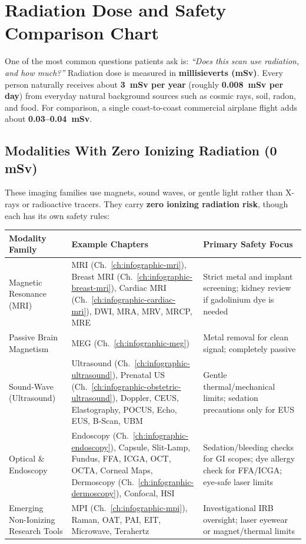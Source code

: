 \chapter{Radiation Dose and Safety Comparison Chart}
\label{app:radiation-chart}

\noindent
One of the most common questions patients ask is: \emph{``Does this scan use radiation, and how much?''} Radiation dose is measured in \textbf{millisieverts (mSv)}. Every person naturally receives about \textbf{3~mSv per year} (roughly \textbf{0.008~mSv per day}) from everyday natural background sources such as cosmic rays, soil, radon, and food. For comparison, a single coast-to-coast commercial airplane flight adds about \textbf{0.03--0.04~mSv}.

\section{Modalities With Zero Ionizing Radiation (0 mSv)}
These imaging families use magnets, sound waves, or gentle light rather than X-rays or radioactive tracers. They carry \textbf{zero ionizing radiation risk}, though each has its own safety rules:

{\renewcommand{\arraystretch}{1.25}\noindent
\begin{tabularx}{\textwidth}{@{}p{} p{} X@{}}
\toprule
\textbf{Modality Family} & \textbf{Example Chapters} & \textbf{Primary Safety Focus} \\
\midrule
Magnetic Resonance (MRI) & MRI (Ch.~\ref{ch:infographic-mri}), Breast MRI (Ch.~\ref{ch:infographic-breast-mri}), Cardiac MRI (Ch.~\ref{ch:infographic-cardiac-mri}), DWI, MRA, MRV, MRCP, MRE & Strict metal and implant screening; kidney review if gadolinium dye is needed \\
Passive Brain Magnetism & MEG (Ch.~\ref{ch:infographic-meg}) & Metal removal for clean signal; completely passive \\
Sound-Wave (Ultrasound) & Ultrasound (Ch.~\ref{ch:infographic-ultrasound}), Prenatal US (Ch.~\ref{ch:infographic-obstetric-ultrasound}), Doppler, CEUS, Elastography, POCUS, Echo, EUS, B-Scan, UBM & Gentle thermal/mechanical limits; sedation precautions only for EUS \\
Optical \& Endoscopy & Endoscopy (Ch.~\ref{ch:infographic-endoscopy}), Capsule, Slit-Lamp, Fundus, FFA, ICGA, OCT, OCTA, Corneal Maps, Dermoscopy (Ch.~\ref{ch:infographic-dermoscopy}), Confocal, HSI & Sedation/bleeding checks for GI scopes; dye allergy check for FFA/ICGA; eye-safe laser limits \\
Emerging Non-Ionizing Research Tools & MPI (Ch.~\ref{ch:infographic-mpi}), Raman, OAT, PAI, EIT, Microwave, Terahertz & Investigational IRB oversight; laser eyewear or magnet/thermal limits \\
\bottomrule
\end{tabularx}}

